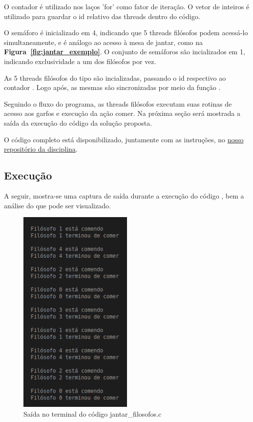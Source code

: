 \documentclass[
	12pt,				%
	openright,			%
	oneside,			%
	a4paper,			%
	chapter=TITLE,		%
	english,			%
	french,				%
	spanish,			%
	brazil				%
	]{abntex2}
\theoremstyle{definition}
\begin{document}
O contador  é utilizado nos laços 'for' como fator de iteração. O vetor de inteiros  é utilizado para guardar o id relativo das threads dentro do código.

O semáforo  é inicializado em 4, indicando que 5 threads filósofos podem acessá-lo simultaneamente, e é análogo ao acesso à mesa de jantar, como na \textbf{Figura~\ref{fig:jantar_exemplo}}. O conjunto de semáforos  são incializados em 1, indicando exclusividade a um dos filósofos por vez.

As 5 threads filósofos  do tipo  são incializadas, passando o id respectivo ao contador . Logo após, as mesmas são sincronizadas por meio da função . 

Seguindo o fluxo do programa, as threads filósofos executam suas rotinas de acesso aos garfos e execução da ação comer. Na próxima seção será mostrada a saída da execução do código da solução proposta.

O código completo está disponibilizado, juntamente com as instruções, no \href{https://github.com/jvictorferreira3301/Sistemas_Operacionais}{nosso repositório da disciplina}.

\newpage
\subsection{Execução}
A seguir, mostra-se uma captura de saída durante a execução do código , bem a análise do que pode ser visualizado.

\begin{figure}[h]
    \centering
    \includegraphics[width=0.5\textwidth]{imagens/out_jantar_filosofos.png}
    \caption{Saída no terminal do código jantar\_filosofos.c}
    \label{fig:out_jantar_filosofos}
\end{figure}
\end{document}
